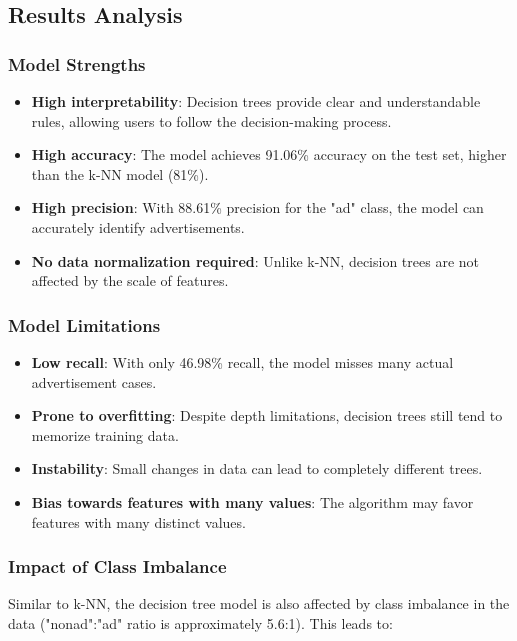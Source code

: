 \subsection{Results Analysis}

\subsubsection{Model Strengths}

\begin{itemize}
    \item \textbf{High interpretability}: Decision trees provide clear and understandable rules, allowing users to follow the decision-making process.
    \item \textbf{High accuracy}: The model achieves 91.06\% accuracy on the test set, higher than the k-NN model (81\%).
    \item \textbf{High precision}: With 88.61\% precision for the "ad" class, the model can accurately identify advertisements.
    \item \textbf{No data normalization required}: Unlike k-NN, decision trees are not affected by the scale of features.
\end{itemize}

\subsubsection{Model Limitations}

\begin{itemize}
    \item \textbf{Low recall}: With only 46.98\% recall, the model misses many actual advertisement cases.
    \item \textbf{Prone to overfitting}: Despite depth limitations, decision trees still tend to memorize training data.
    \item \textbf{Instability}: Small changes in data can lead to completely different trees.
    \item \textbf{Bias towards features with many values}: The algorithm may favor features with many distinct values.
\end{itemize}

\subsubsection{Impact of Class Imbalance}

Similar to k-NN, the decision tree model is also affected by class imbalance in the data ("nonad":"ad" ratio is approximately 5.6:1). This leads to:

